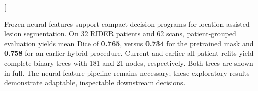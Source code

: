\usepackage[accepted]{icml2026}
\makeatletter\renewcommand{\Notice@String}{}\makeatother
\usepackage{amsmath,amssymb,tikz}
\newcommand{\doi}[1]{\href{https://doi.org/#1}{doi:~\nolinkurl{#1}}}

\twocolumn[
\begin{icmlauthorlist}
\end{icmlauthorlist}
\vskip 0.12in
{\begin{minipage}{.94\textwidth}\small Frozen neural features support compact decision programs for location-assisted lesion segmentation. On 32 RIDER patients and 62 scans, patient-grouped evaluation yields mean Dice of \textbf{0.765}, versus \textbf{0.734} for the pretrained mask and \textbf{0.758} for an earlier hybrid procedure. Current and earlier all-patient refits yield complete binary trees with 181 and 21 nodes, respectively. Both trees are shown in full. The neural feature pipeline remains necessary; these exploratory results demonstrate adaptable, inspectable downstream decisions.\end{minipage}}
\vskip 0.12in
